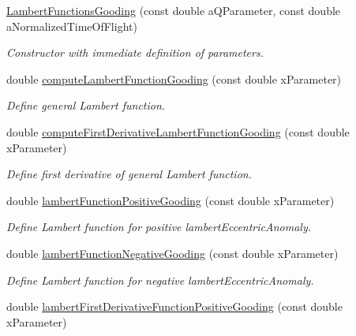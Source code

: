 \begin{DoxyCompactItemize}
\item 
\hyperlink{classtudat_1_1mission__segments_1_1LambertFunctionsGooding_a20ab9d6cb406bcf2859118ecbbd4bfa3}{Lambert\+Functions\+Gooding} (const double a\+Q\+Parameter, const double a\+Normalized\+Time\+Of\+Flight)
\begin{DoxyCompactList}\small\item\em Constructor with immediate definition of parameters. \end{DoxyCompactList}\item 
double \hyperlink{classtudat_1_1mission__segments_1_1LambertFunctionsGooding_a2e79db651f15d2e0c749131dec97a4b0}{compute\+Lambert\+Function\+Gooding} (const double x\+Parameter)
\begin{DoxyCompactList}\small\item\em Define general Lambert function. \end{DoxyCompactList}\item 
double \hyperlink{classtudat_1_1mission__segments_1_1LambertFunctionsGooding_a840445c6a6a6e641071d345a30351149}{compute\+First\+Derivative\+Lambert\+Function\+Gooding} (const double x\+Parameter)
\begin{DoxyCompactList}\small\item\em Define first derivative of general Lambert function. \end{DoxyCompactList}\item 
double \hyperlink{classtudat_1_1mission__segments_1_1LambertFunctionsGooding_a6a4439f4b7f8a5375b1989140131a894}{lambert\+Function\+Positive\+Gooding} (const double x\+Parameter)
\begin{DoxyCompactList}\small\item\em Define Lambert function for positive lambert\+Eccentric\+Anomaly. \end{DoxyCompactList}\item 
double \hyperlink{classtudat_1_1mission__segments_1_1LambertFunctionsGooding_ab0a5a78377684e239ea851700571e32a}{lambert\+Function\+Negative\+Gooding} (const double x\+Parameter)
\begin{DoxyCompactList}\small\item\em Define Lambert function for negative lambert\+Eccentric\+Anomaly. \end{DoxyCompactList}\item 
double \hyperlink{classtudat_1_1mission__segments_1_1LambertFunctionsGooding_afb44881b2d389192522574b5be5f7e0d}{lambert\+First\+Derivative\+Function\+Positive\+Gooding} (const double x\+Parameter)

\end{DoxyCompactItemize}
